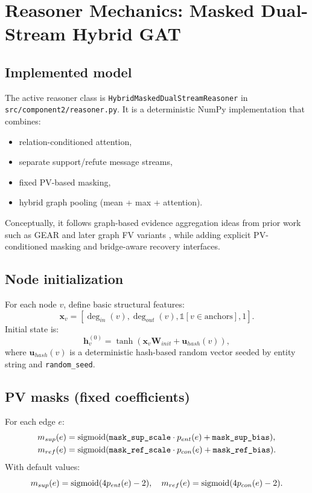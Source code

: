 \section{Reasoner Mechanics: Masked Dual-Stream Hybrid GAT}
\label{sec:reasoner}

\subsection{Implemented model}
The active reasoner class is
\texttt{HybridMaskedDualStreamReasoner} in \texttt{src/component2/reasoner.py}.
It is a deterministic NumPy implementation that combines:
\begin{itemize}
\item relation-conditioned attention,
\item separate support/refute message streams,
\item fixed PV-based masking,
\item hybrid graph pooling (mean + max + attention).
\end{itemize}
Conceptually, it follows graph-based evidence aggregation ideas from prior work such as GEAR and later graph FV variants \cite{zhou2019gear,lan2024cogat}, while adding explicit PV-conditioned masking and bridge-aware recovery interfaces.

\subsection{Node initialization}
For each node $v$, define basic structural features:
\[
\mathbf{x}_v = [\deg_{in}(v),\deg_{out}(v),\mathbb{1}[v\in \text{anchors}],1].
\]
Initial state is:
\[
\mathbf{h}^{(0)}_v = \tanh(\mathbf{x}_v \mathbf{W}_{init} + \mathbf{u}_{hash}(v)),
\]
where $\mathbf{u}_{hash}(v)$ is a deterministic hash-based random vector seeded by entity string and \texttt{random\_seed}.

\subsection{PV masks (fixed coefficients)}
For each edge $e$:
\begin{align}
 m_{sup}(e) &= \operatorname{sigmoid}(\texttt{mask\_sup\_scale}\cdot p_{ent}(e)+\texttt{mask\_sup\_bias}), \\
 m_{ref}(e) &= \operatorname{sigmoid}(\texttt{mask\_ref\_scale}\cdot p_{con}(e)+\texttt{mask\_ref\_bias}).
\end{align}
With default values:
\[
m_{sup}(e)=\operatorname{sigmoid}(4p_{ent}(e)-2),\quad
m_{ref}(e)=\operatorname{sigmoid}(4p_{con}(e)-2).
\]


